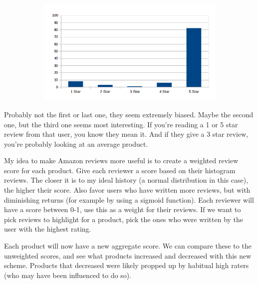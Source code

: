 \documentclass[a4paper,10pt]{article}
\begin{document}
\begin{figure}[H]
\begin{subfigure}{.24\textwidth}
  \label{fig:sub3}
\end{subfigure}%
\begin{subfigure}{.24\textwidth}
  \centering
  \includegraphics[width=1\linewidth]{4reviewers/pos.png}
  \label{fig:sub4}
\end{subfigure}%
\label{fig:test}
\end{figure}

Probably not the first or last one, they seem extremely biased. Maybe the second one, but the third one seems most interesting. If you're reading a 1 or 5 star review from that user, you know they mean it. And if they give a 3 star review, you're probably looking at an average product.

My idea to make Amazon reviews more useful is to create a weighted review score for each product. Give each reviewer a score based on their histogram reviews. The closer it is to my ideal history (a normal distribution in this case), the higher their score. Also favor users who have written more reviews, but with diminishing returns (for example by using a sigmoid function). Each reviewer will have a score between 0-1, use this as a weight for their reviews. If we want to pick reviews to highlight for a product, pick the ones who were written by the user with the highest rating.

Each product will now have a new aggregate score. We can compare these to the unweighted scores, and see what products increased and decreased with this new scheme. Products that decreased were likely propped up by habitual high raters (who may have been influenced to do so).
\end{document}
